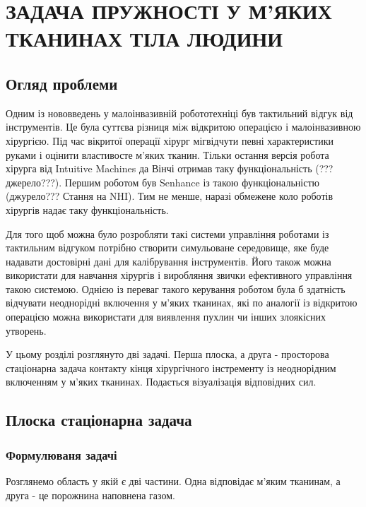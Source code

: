 \chapter{ЗАДАЧА ПРУЖНОСТІ У М'ЯКИХ ТКАНИНАХ ТІЛА ЛЮДИНИ}

\nocite{bahvalov-et-al,benerdge-et-al} 

\section{Огляд проблеми}

Одним із нововведень у малоінвазивній робототехніці був тактильний відгук від інструментів. Це була суттєва різниця між
відкритою операцією і малоінвазивною хірургією. Під час вікритої операції хірург міг відчути певні
характеристики руками і оцінити властивосте м'яких тканин. Тільки остання версія робота хірурга від Intuitive Machines
да Вінчі отримав таку функціональність (???джерело???). Першим роботом був Senhance із такою функціональністю
(джурело??? Стання на NHI). Тим не менше, наразі обмежене коло роботів хірургів надає таку функціональність.

Для того щоб можна було розробляти такі системи управління роботами із тактильним відгуком потрібно створити симульоване 
середовище, яке буде надавати достовірні дані для калібрування інструментів. Його також можна використати для навчання
хірургів і виробляння звички ефективного управління такою системою. Однією із переваг такого керування роботом була б 
здатність відчувати неоднорідні включення у м'яких тканинах, які по аналогії із відкритою операцією можна використати 
для виявлення пухлин чи інших злоякісних утворень.

У цьому розділі розглянуто дві задачі. Перша плоска, а друга - просторова стаціонарна задача контакту кінця хірургічного 
інстременту із неоднорідним включенням у м'яких тканинах. Подається візуалізація відповідних сил.

\section{Плоска стаціонарна задача}

\subsection{Формулюваня задачі}

Розглянемо область у якій є дві частини. Одна відповідає м'яким тканинам, а друга - це порожнина наповнена газом.

